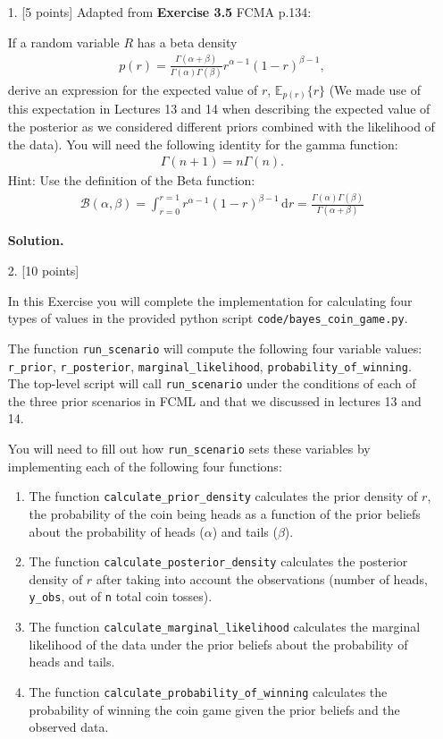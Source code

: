 \documentclass[10pt]{article}
\begin{document}
\newpage
\begin{itemize}

\item[1.]  [5 points]
Adapted from {\bf Exercise 3.5} FCMA p.134:

If a random variable $R$ has a beta density
\begin{eqnarray*}
p(r) = \frac{\Gamma(\alpha + \beta)}{\Gamma(\alpha) \Gamma(\beta)} r^{\alpha - 1} (1-r)^{\beta - 1},
\end{eqnarray*}
derive an expression for the expected value of $r$, $\mathbb{E}_{p(r)}\{r\}$ (We made use of this expectation in Lectures 13 and 14 when describing the expected value of the posterior as we considered different priors combined with the likelihood of the data). You will need the following identity for the gamma function:
\begin{eqnarray*}
\Gamma(n+1) = n \Gamma(n).
\end{eqnarray*}
Hint: Use the definition of the Beta function:
\begin{eqnarray*}
\mathcal{B}(\alpha, \beta) = \int_{r=0}^{r=1} r^{\alpha-1}(1-r)^{\beta - 1} \,\mathrm{d}r = \frac{\Gamma(\alpha) \Gamma(\beta)}{\Gamma(\alpha + \beta)}
\end{eqnarray*}

{\bf Solution.}


\item[2.]  [10 points]

In this Exercise you will complete the implementation for calculating four types of values in the provided python script {\tt code/bayes\_coin\_game.py}. 

The function {\tt run\_scenario} will compute the following four variable values: {\tt r\_prior}, {\tt r\_posterior}, {\tt marginal\_likelihood}, {\tt probability\_of\_winning}. The top-level script will call {\tt run\_scenario} under the conditions of each of the three prior scenarios in FCML and that we discussed in lectures 13 and 14.

You will need to fill out how {\tt run\_scenario} sets these variables by implementing each of the following four functions:
\begin{enumerate}
\item The function {\tt calculate\_prior\_density} calculates the prior density of $r$, the probability of the coin being heads as a function of the prior beliefs about the probability of heads ($\alpha$) and tails ($\beta$).
\item The function {\tt calculate\_posterior\_density} calculates the posterior density of $r$ after taking into account the observations (number of heads, {\tt y\_obs}, out of {\tt n} total coin tosses).
\item The function {\tt calculate\_marginal\_likelihood} calculates the marginal likelihood of the data under the prior beliefs about the probability of heads and tails.
\item The function {\tt calculate\_probability\_of\_winning} calculates the probability of winning the coin game given the prior beliefs and the observed data.
\end{enumerate}


\end{itemize}
\end{document}
